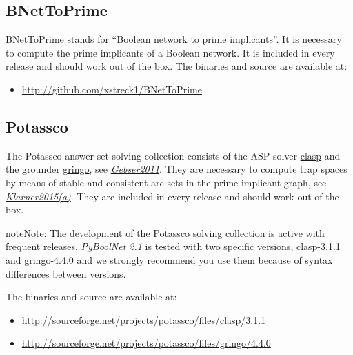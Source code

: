 \documentclass[letterpaper,10pt,english]{sphinxmanual}
\begin{document}
\subsection{BNetToPrime}
\label{Installation:bnettoprime}\label{Installation:installation-bnettoprime}
\href{https://github.com/xstreck1/BNetToPrime}{BNetToPrime} stands for ``Boolean network to prime implicants''. It is necessary to compute the prime implicants of a Boolean network. It is included in every release and should work out of the box. The binaries and source are available at:
\begin{itemize}
\item {} 
\href{http://github.com/xstreck1/BNetToPrime}{http://github.com/xstreck1/BNetToPrime}

\end{itemize}


\subsection{Potassco}
\label{Installation:installation-potassco}\label{Installation:potassco}
The Potassco answer set solving collection consists of the ASP solver \href{http://potassco.sourceforge.net/\#clasp}{clasp} and the grounder \href{http://potassco.sourceforge.net/\#gringo}{gringo}, see {\hyperref[Bibliography:gebser2011]{\emph{Gebser2011}}}.
They are necessary to compute trap spaces by means of stable and consistent arc sets in the prime implicant graph, see {\hyperref[Bibliography:klarner2015trap]{\emph{Klarner2015(a)}}}. They are included in every release and should work out of the box.

\begin{notice}{note}{Note:}
The development of the Potassco solving collection is active with frequent releases.
\emph{PyBoolNet 2.1} is tested with two specific versions, \href{https://sourceforge.net/projects/potassco/files/clasp/3.1.1}{clasp-3.1.1} and \href{https://sourceforge.net/projects/potassco/files/gringo/4.4.0}{gringo-4.4.0} and we strongly recommend you use them because of syntax differences between versions.
\end{notice}

The binaries and source are available at:
\begin{itemize}
\item {} 
\href{http://sourceforge.net/projects/potassco/files/clasp/3.1.1}{http://sourceforge.net/projects/potassco/files/clasp/3.1.1}

\item {} 
\href{http://sourceforge.net/projects/potassco/files/gringo/4.4.0}{http://sourceforge.net/projects/potassco/files/gringo/4.4.0}

\end{itemize}
\end{document}
